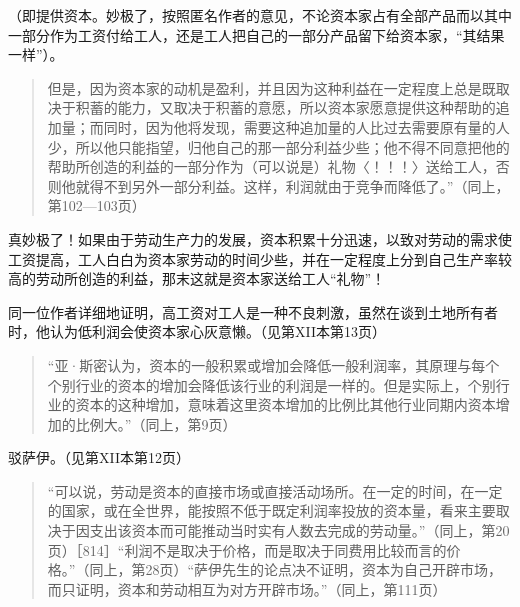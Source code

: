 （即提供资本。妙极了，按照匿名作者的意见，不论资本家占有全部产品而以其中一部分作为工资付给工人，还是工人把自己的一部分产品留下给资本家，“其结果一样”）。

\begin{quote}{但是，因为资本家的动机是盈利，并且因为这种利益在一定程度上总是既取决于积蓄的能力，又取决于积蓄的意愿，所以资本家愿意提供这种帮助的追加量；而同时，因为他将发现，需要这种追加量的人比过去需要原有量的人少，所以他只能指望，归他自己的那一部分利益少些；他不得不同意把他的帮助所创造的利益的一部分作为（可以说是）礼物〈！！！〉送给工人，否则他就得不到另外一部分利益。这样，利润就由于竞争而降低了。”（同上，第102—103页）}\end{quote}

真妙极了！如果由于劳动生产力的发展，资本积累十分迅速，以致对劳动的需求使工资提高，工人白白为资本家劳动的时间少些，并在一定程度上分到自己生产率较高的劳动所创造的利益，那末这就是资本家送给工人“礼物”！

同一位作者详细地证明，高工资对工人是一种不良刺激，虽然在谈到土地所有者时，他认为低利润会使资本家心灰意懒。（见第XII本第13页）

\begin{quote}{“亚·斯密认为，资本的一般积累或增加会降低一般利润率，其原理与每个个别行业的资本的增加会降低该行业的利润是一样的。但是实际上，个别行业的资本的这种增加，意味着这里资本增加的比例比其他行业同期内资本增加的比例大。”（同上，第9页）}\end{quote}

驳萨伊。（见第XII本第12页）

\begin{quote}{“可以说，劳动是资本的直接市场或直接活动场所。在一定的时间，在一定的国家，或在全世界，能按照不低于既定利润率投放的资本量，看来主要取决于因支出该资本而可能推动当时实有人数去完成的劳动量。”（同上，第20页）［814］“利润不是取决于价格，而是取决于同费用比较而言的价格。”（同上，第28页）“萨伊先生的论点决不证明，资本为自己开辟市场，而只证明，资本和劳动相互为对方开辟市场。”（同上，第111页）}\end{quote}

